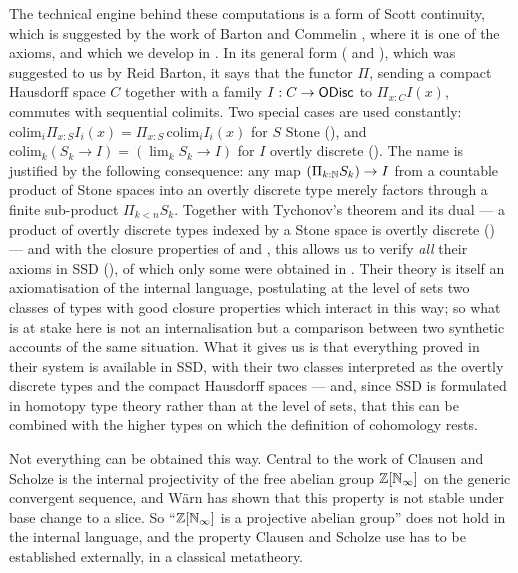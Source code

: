 The technical engine behind these computations is a form of Scott continuity,
which is suggested by the work of Barton and Commelin \cite{bc24}, where it is
one of the axioms, and which we develop in
. In its general form
( and ), which
was suggested to us by Reid Barton, it says
that the functor $\Pi$, sending a compact Hausdorff space $C$ together with a
family $I : C \to \mathsf{ODisc}$ to $\Pi_{x:C}I(x)$, commutes with sequential colimits.
Two special cases are used constantly: $\mathrm{colim}_i \Pi_{x:S}I_i(x) =
\Pi_{x:S}\,\mathrm{colim}_i I_i(x)$ for $S$ Stone
(), and $\mathrm{colim}_k(S_k \to I) = (\lim_k S_k
\to I)$ for $I$ overtly discrete (). The name is
justified by the following consequence: any map $(\Pi_{k:\mathbb{N}}S_k) \to I$ from a
countable product of Stone spaces into an overtly discrete type merely factors
through a finite sub-product $\Pi_{k<n}S_k$. Together with Tychonov's theorem and
its dual --- a product of overtly discrete types indexed by a Stone
space is overtly discrete () --- and with the closure
properties of  and , this allows
us to verify \emph{all} their axioms in SSD (), of which
only some were obtained in \cite{synthetic-stone-duality}. Their theory is itself
an axiomatisation of the internal language, postulating at the level of sets two
classes of types with good closure properties which interact in this way; so what
is at stake here is not an internalisation but a comparison between two synthetic
accounts of the same situation. What it gives us is that everything proved in
their system is available in SSD, with their two classes interpreted as the
overtly discrete types and the compact Hausdorff spaces --- and, since SSD is formulated
in homotopy type theory rather than at the level of sets, that this can be
combined with the higher types on which the definition of cohomology rests.

Not everything can be obtained this way. Central to the work of Clausen and
Scholze is the internal projectivity of the free abelian group $\mathbb{Z}[\mathbb{N}_{\infty}]$ on the
generic convergent sequence, and W\"arn \cite{warn2024} has shown that this
property is not stable under base change to a slice. So ``$\mathbb{Z}[\mathbb{N}_{\infty}]$ is a
projective abelian group'' does not hold in the internal language, and the
property Clausen and Scholze use has to be established externally, in a
classical metatheory.


